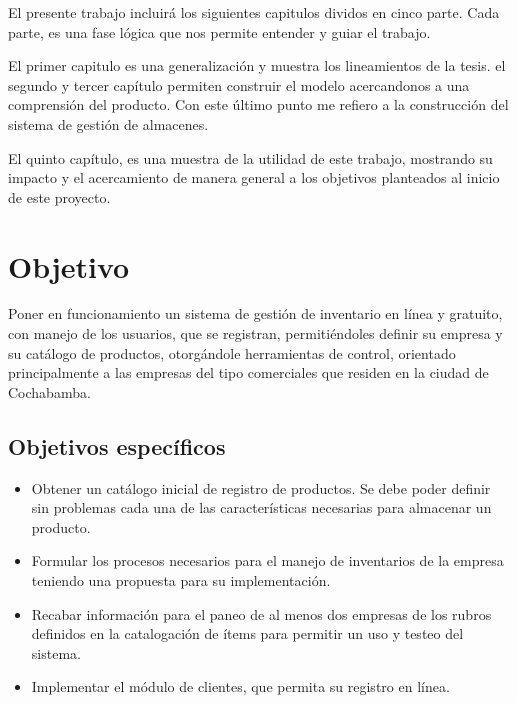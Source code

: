 El presente trabajo incluirá los siguientes capitulos dividos en cinco parte. Cada parte, es una fase lógica que nos permite entender y guiar el trabajo.

El primer capitulo es una generalización y muestra los lineamientos de la tesis. el segundo y tercer capítulo permiten construir el modelo acercandonos a una comprensión del producto. Con este último punto me refiero a la construcción del sistema de gestión de almacenes.

El quinto capítulo, es una muestra de la utilidad de este trabajo, mostrando su impacto y el acercamiento de manera general a los objetivos planteados al inicio de este proyecto.


\section{Objetivo}

Poner en funcionamiento un sistema de gestión de inventario en línea y gratuito, con manejo de los usuarios, que se registran, permitiéndoles definir su empresa y su catálogo de productos, otorgándole herramientas de control, orientado principalmente a las empresas del tipo comerciales que residen en la ciudad de Cochabamba.

\subsection{Objetivos específicos}

\begin{itemize}

\item Obtener un catálogo inicial de registro de productos. Se debe poder definir sin problemas cada una de las características necesarias para almacenar un producto.
\item Formular los procesos  necesarios para el manejo de inventarios de la empresa teniendo una propuesta para su implementación.
\item Recabar información para el paneo de al menos dos empresas de los rubros definidos en la catalogación de ítems para permitir un uso y testeo del sistema.
\item Implementar el módulo de clientes, que permita su registro en línea.

\end{itemize}

